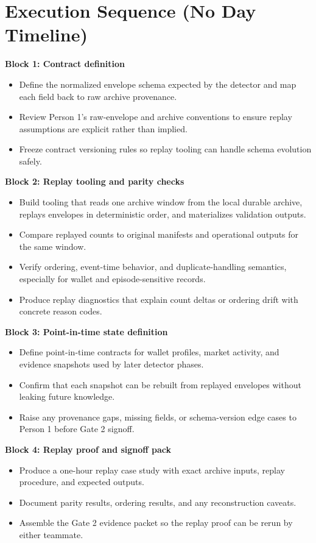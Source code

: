\documentclass{article}
\begin{document}
\section*{Execution Sequence (No Day Timeline)}
\textbf{Block 1: Contract definition}
\begin{itemize}
\item Define the normalized envelope schema expected by the detector and map each field back to raw archive provenance.
\item Review Person 1's raw-envelope and archive conventions to ensure replay assumptions are explicit rather than implied.
\item Freeze contract versioning rules so replay tooling can handle schema evolution safely.
\end{itemize}

\textbf{Block 2: Replay tooling and parity checks}
\begin{itemize}
\item Build tooling that reads one archive window from the local durable archive, replays envelopes in deterministic order, and materializes validation outputs.
\item Compare replayed counts to original manifests and operational outputs for the same window.
\item Verify ordering, event-time behavior, and duplicate-handling semantics, especially for wallet and episode-sensitive records.
\item Produce replay diagnostics that explain count deltas or ordering drift with concrete reason codes.
\end{itemize}

\textbf{Block 3: Point-in-time state definition}
\begin{itemize}
\item Define point-in-time contracts for wallet profiles, market activity, and evidence snapshots used by later detector phases.
\item Confirm that each snapshot can be rebuilt from replayed envelopes without leaking future knowledge.
\item Raise any provenance gaps, missing fields, or schema-version edge cases to Person 1 before Gate 2 signoff.
\end{itemize}

\textbf{Block 4: Replay proof and signoff pack}
\begin{itemize}
\item Produce a one-hour replay case study with exact archive inputs, replay procedure, and expected outputs.
\item Document parity results, ordering results, and any reconstruction caveats.
\item Assemble the Gate 2 evidence packet so the replay proof can be rerun by either teammate.
\end{itemize}
\end{document}
